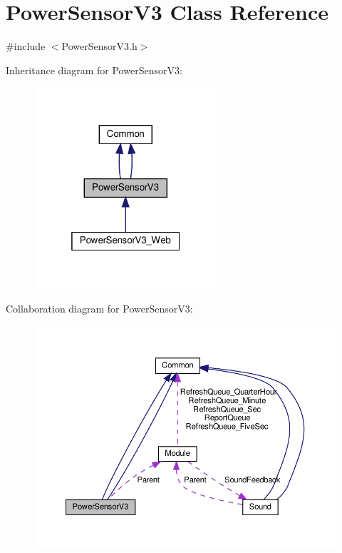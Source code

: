 \hypertarget{class_power_sensor_v3}{}\section{Power\+Sensor\+V3 Class Reference}
\label{class_power_sensor_v3}


{\ttfamily \#include $<$Power\+Sensor\+V3.\+h$>$}



Inheritance diagram for Power\+Sensor\+V3\+:
\nopagebreak
\begin{figure}[H]
\begin{center}
\leavevmode
\includegraphics[width=193pt]{class_power_sensor_v3__inherit__graph}
\end{center}
\end{figure}


Collaboration diagram for Power\+Sensor\+V3\+:
\nopagebreak
\begin{figure}[H]
\begin{center}
\leavevmode
\includegraphics[width=350pt]{class_power_sensor_v3__coll__graph}
\end{center}
\end{figure}
